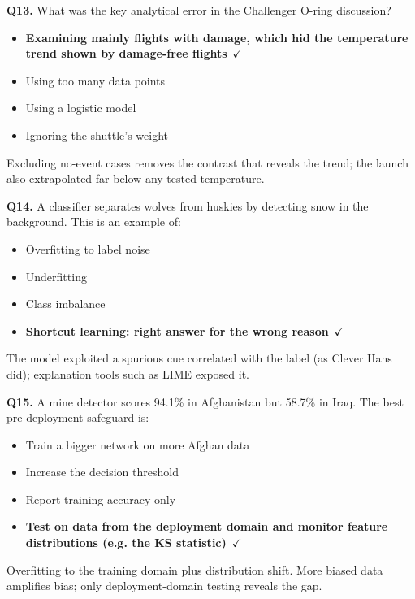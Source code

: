 \documentclass[11pt]{article}
\begin{document}
{\noindent\textbf{Q13.} What was the key analytical error in the Challenger O-ring discussion?\begin{itemize}[leftmargin=2.2em,itemsep=0pt,topsep=1pt]\item[\textbf{A.}] \textbf{Examining mainly flights with damage, which hid the temperature trend shown by damage-free flights}~{\color{GrnN}$\checkmark$}\item[B.] Using too many data points\item[C.] Using a logistic model\item[D.] Ignoring the shuttle's weight\end{itemize} Excluding no-event cases removes the contrast that reveals the trend; the launch also extrapolated far below any tested temperature.\par\medskip

\noindent\textbf{Q14.} A classifier separates wolves from huskies by detecting snow in the background. This is an example of:\begin{itemize}[leftmargin=2.2em,itemsep=0pt,topsep=1pt]\item[A.] Overfitting to label noise\item[B.] Underfitting\item[C.] Class imbalance\item[\textbf{D.}] \textbf{Shortcut learning: right answer for the wrong reason}~{\color{GrnN}$\checkmark$}\end{itemize} The model exploited a spurious cue correlated with the label (as Clever Hans did); explanation tools such as LIME exposed it.\par\medskip

\noindent\textbf{Q15.} A mine detector scores 94.1\% in Afghanistan but 58.7\% in Iraq. The best pre-deployment safeguard is:\begin{itemize}[leftmargin=2.2em,itemsep=0pt,topsep=1pt]\item[A.] Train a bigger network on more Afghan data\item[B.] Increase the decision threshold\item[C.] Report training accuracy only\item[\textbf{D.}] \textbf{Test on data from the deployment domain and monitor feature distributions (e.g. the KS statistic)}~{\color{GrnN}$\checkmark$}\end{itemize} Overfitting to the training domain plus distribution shift. More biased data amplifies bias; only deployment-domain testing reveals the gap.\par\medskip

}
\end{document}
